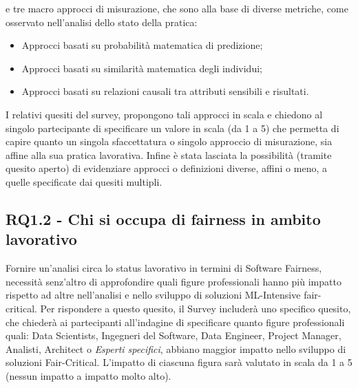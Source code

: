 	e tre macro approcci di misurazione, che sono alla base di diverse metriche, come osservato nell'analisi dello stato della pratica:
	
	\begin{itemize}
		\item Approcci basati su probabilità matematica di predizione;
		\item Approcci basati su similarità matematica degli individui;
		\item Approcci basati su relazioni causali tra attributi sensibili e risultati.
	\end{itemize}

	I relativi quesiti del survey, propongono tali approcci in scala e chiedono al singolo partecipante di specificare un valore in scala (da 1 a 5) che permetta di capire quanto un singola sfaccettatura o singolo approccio di misurazione, sia affine alla sua pratica lavorativa. Infine è stata lasciata la possibilità (tramite quesito aperto) di evidenziare approcci o definizioni diverse, affini o meno, a quelle specificate dai quesiti multipli.\\
	
	\subsection{RQ1.2 - Chi si occupa di fairness in ambito lavorativo}
	\begin{center}
		\hspace*{-5mm}%
	\end{center}
	
	Fornire un'analisi circa lo status lavorativo in termini di Software Fairness, necessità senz'altro di approfondire quali figure professionali hanno più impatto rispetto ad altre nell'analisi e nello sviluppo di soluzioni ML-Intensive fair-critical. Per rispondere a questo quesito, il Survey includerà uno specifico quesito, che chiederà ai partecipanti all'indagine di specificare quanto figure professionali quali: Data Scientists, Ingegneri del Software, Data Engineer, Project Manager, Analisti, Architect o \emph{Esperti specifici}, abbiano maggior impatto nello sviluppo di soluzioni Fair-Critical. L'impatto di ciascuna figura sarà valutato in scala da 1 a 5 (nessun impatto a impatto molto alto).\\
	

